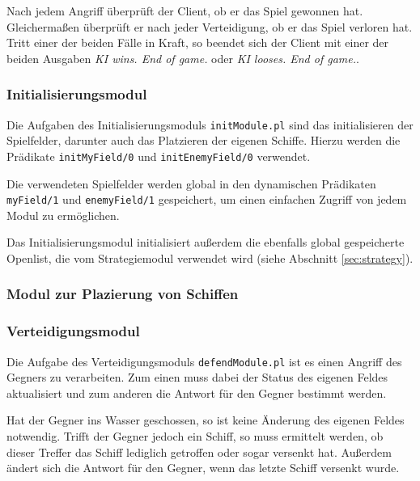 	Nach jedem Angriff überprüft der Client, ob er das Spiel gewonnen hat. Gleichermaßen überprüft er nach jeder Verteidigung, 
	ob er das Spiel verloren hat. Tritt einer der beiden Fälle in Kraft, so beendet sich der Client mit einer der beiden Ausgaben
	\textit{KI wins. End of game.} oder \textit{KI looses. End of game.}.
	

\subsubsection{Initialisierungsmodul} \label{sec:initModule}
	Die Aufgaben des Initialisierungsmoduls \texttt{initModule.pl} sind das initialisieren der Spielfelder, darunter auch
	das Platzieren der eigenen Schiffe. Hierzu werden die Prädikate \texttt{initMyField/0} und \texttt{initEnemyField/0} verwendet.
	
	Die verwendeten Spielfelder werden global in den dynamischen Prädikaten \texttt{myField/1} und \texttt{enemyField/1}
	gespeichert, um einen einfachen Zugriff von jedem Modul zu ermöglichen. 
	
	Das Initialisierungsmodul initialisiert außerdem die ebenfalls global gespeicherte Openlist, 
	die vom Strategiemodul verwendet wird (siehe Abschnitt \ref{sec:strategy}). 


\subsubsection{Modul zur Plazierung von Schiffen} \label{sec:initships}	
	
\subsubsection{Verteidigungsmodul} \label{sec:defendModule}
	Die Aufgabe des Verteidigungsmoduls \texttt{defendModule.pl} ist es einen Angriff des Gegners zu verarbeiten.
	Zum einen muss dabei der Status des eigenen Feldes aktualisiert und zum anderen die Antwort für den Gegner bestimmt werden.
	
	Hat der Gegner ins Wasser geschossen, so ist keine Änderung des eigenen Feldes notwendig. Trifft der Gegner jedoch ein Schiff,
	so muss ermittelt werden, ob dieser Treffer das Schiff lediglich getroffen oder sogar versenkt hat. Außerdem ändert sich die Antwort
	für den Gegner, wenn das letzte Schiff versenkt wurde.
	
	
	
